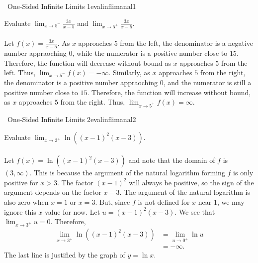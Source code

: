         \pagebreak
        \begin{example}{\Difficulty\,\Difficulty\,\,One-Sided Infinite Limits 1}{evalinflimanal1}
            
            Evaluate \(\lim_{x\to 5^-}\frac{3x}{x-5}\) and \(\lim_{x\to 5^+}\frac{3x}{x-5}\).
            \\
            \\
            Let \(f(x)=\frac{3x}{x-5}\). As \(x\) approaches \(5\) from the left, the denominator is a negative number appraoching \(0\), while the numerator is a positive number close to \(15\). Therefore, the function will decrease without bound as \(x\) approaches \(5\) from the left. Thus, \(\lim_{x\to5^-}f(x)=-\infty\). Similarly, as \(x\) approaches \(5\) from the right, the denominator is a positive number appraoching \(0\), and the numerator is still a positive number close to \(15\). Therefore, the function will increase without bound, as \(x\) approaches \(5\) from the right. Thus, \(\lim_{x\to5^+}f(x)=\infty\).

        \end{example}
        \begin{example}{\Difficulty\,\Difficulty\,\,One-Sided Infinite Limits 2}{evalinflimanal2}
            
            Evaluate \(\lim_{x\to3^+}\ln((x-1)^2(x-3))\).
            \\
            \\
            Let \(f(x)=\ln((x-1)^2(x-3))\) and note that the domain of \(f\) is \((3,\infty)\). This is because the argument of the natural logarithm forming \(f\) is only positive for \(x>3\). The factor \((x-1)^2\) will always be positive, so the sign of the argument depends on the factor \(x-3\). The argument of the natural logarithm is also zero when \(x=1\) or \(x=3\). But, since \(f\) is not defined for \(x\) near \(1\), we may ignore this \(x\) value for now. Let \(u=(x-1)^2(x-3)\). We see that \(\lim_{x\to 3^+}u=0\). Therefore,
            \begin{align*}
                \lim_{x\to 3^+}\ln((x-1)^2(x-3))&=\lim_{u\to0^+}\ln u \\
                &=-\infty.
            \end{align*}
            The last line is justified by the graph of \(y=\ln x\).

        \end{example}
        \vphantom
        \\
        \\
